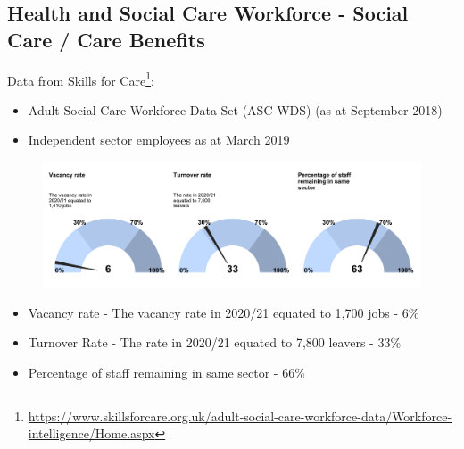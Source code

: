 


\subsection{Health and Social Care Workforce - Social Care / Care Benefits}
Data from Skills for Care\footnote{\url{https://www.skillsforcare.org.uk/adult-social-care-workforce-data/Workforce-intelligence/Home.aspx}}:
\begin{itemize}[noitemsep]
    \item Adult Social Care Workforce Data Set (ASC-WDS) (as at September 2018)
    \item Independent sector employees as at March 2019
\end{itemize}

\begin{figure}[h]
    \centering
    \includegraphics[width=\linewidth]{images/workforce_dial_chart.png}
\end{figure}

\begin{itemize}[noitemsep]
    \item Vacancy rate - The vacancy rate in 2020/21 equated to 1,700 jobs - 6\%
    \item Turnover Rate - The rate in 2020/21 equated to 7,800 leavers - 33\%
    \item Percentage of staff remaining in same sector - 66\%
\end{itemize} 

